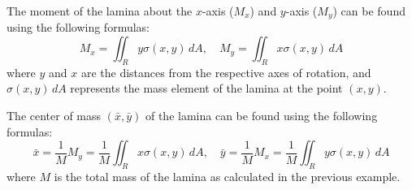 \documentclass[11pt]{report}
\begin{document}
\begin{definition}
    The moment of the lamina about the $x$-axis ($M_x$) and $y$-axis ($M_y$) can be found using the following formulas:
    \begin{equation}
        M_x = \iint_R y \sigma(x,y) \, dA, \quad M_y = \iint_R x \sigma(x,y) \, dA
    \end{equation}
    where $y$ and $x$ are the distances from the respective axes of rotation, and $\sigma(x,y) \, dA$ represents the mass element of the lamina at the point $(x,y)$.
\end{definition}

\begin{definition}
    The center of mass $(\bar{x}, \bar{y})$ of the lamina can be found using the following formulas:
    \begin{equation}
        \bar{x} = \frac{1}{M} M_y = \frac{1}{M} \iint_R x \sigma(x,y) \, dA, \quad \bar{y} = \frac{1}{M} M_x = \frac{1}{M} \iint_R y \sigma(x,y) \, dA
    \end{equation}
    where $M$ is the total mass of the lamina as calculated in the previous example.
\end{definition}
\end{document}
